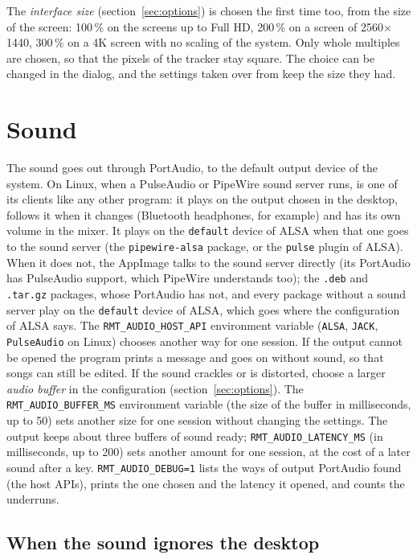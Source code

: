 The \emph{interface size} (section~\ref{sec:options}) is chosen the first time too, from the size of the screen: 100\,\% on the screens up to Full HD,
200\,\% on a screen of 2560$\times$1440, 300\,\% on a 4K screen with no scaling of the system. Only whole multiples are chosen, so that the pixels of the
tracker stay square. The choice can be changed in the  dialog, and the settings taken over from \RMT{} keep the size they had.

\section{Sound}

The sound goes out through PortAudio, to the default output device of the system. On Linux, when a PulseAudio or
PipeWire sound server runs, \RITMO{} is one of its clients like any other program: it plays on the output chosen in the
desktop, follows it when it changes (Bluetooth headphones, for example) and has its own volume in the mixer. It plays on
the \texttt{default} device of ALSA when that one goes to the sound server (the \texttt{pipewire-alsa} package, or the
\texttt{pulse} plugin of ALSA). When it does not, the AppImage talks to the sound server directly (its PortAudio has
PulseAudio support, which PipeWire understands too); the \texttt{.deb} and \texttt{.tar.gz} packages, whose PortAudio
has not, and every package without a sound server play on the \texttt{default} device of ALSA, which goes where the
configuration of ALSA says. The \texttt{RMT\_AUDIO\_HOST\_API} environment variable
(\texttt{ALSA}, \texttt{JACK}, \texttt{PulseAudio} on Linux) chooses another way for one session. If the output cannot be opened
the program prints a message and goes on without sound, so that songs can still be edited. If the sound
crackles or is distorted, choose a larger \emph{audio buffer} in the configuration (section~\ref{sec:options}).
The \texttt{RMT\_AUDIO\_BUFFER\_MS} environment variable (the size of the buffer in milliseconds, up to 50) sets
another size for one session without changing the settings. The output keeps about three buffers of sound ready;
\texttt{RMT\_AUDIO\_LATENCY\_MS} (in milliseconds, up to 200) sets another amount for one session, at the cost of a later
sound after a key. \texttt{RMT\_AUDIO\_DEBUG=1} lists the ways of output PortAudio found (the host APIs), prints the
one chosen and the latency it opened, and counts the underruns.

\subsection{When the sound ignores the desktop}

